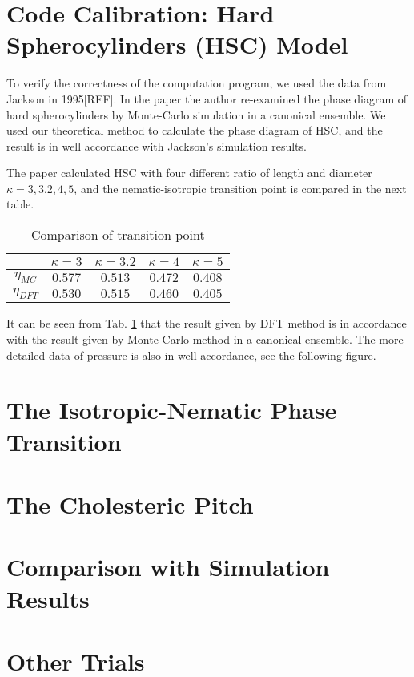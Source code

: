 \section{Code Calibration: Hard Spherocylinders (HSC) Model}
To verify the correctness of the computation program, we used the data from Jackson in 1995[REF]. In the paper the author re-examined the phase diagram of hard spherocylinders by Monte-Carlo simulation in a canonical ensemble. We used our theoretical method to calculate the phase diagram of HSC, and the result is in well accordance with Jackson's simulation results.

The paper calculated HSC with four different ratio of length and diameter $\kappa=3,3.2,4,5$, and the nematic-isotropic transition point is compared in the next table.

\begin{table}[h!]
	\caption{Comparison of transition point}
	\label{tab:comparison1995}
	\centering
	\begin{tabular}{c|cccc}
		\toprule
		 & $\kappa=3$ & $\kappa=3.2$ & $\kappa=4$ & $\kappa=5$\\
		\midrule
		$\eta_{MC}$ &  $0.577$ & $0.513$ & $0.472$ & $0.408$\\
		$\eta_{DFT}$ & $0.530$ & $0.515$ & $0.460$ & $0.405$\\
		\bottomrule
	\end{tabular}
\end{table}

It can be seen from Tab. \ref{tab:comparison1995} that the result given by DFT method is in accordance with the result given by Monte Carlo method in a canonical ensemble. The more detailed data of pressure is also in well accordance, see the following figure.

\section{The Isotropic-Nematic Phase Transition}



\section{The Cholesteric Pitch}

\section{Comparison with Simulation Results}

\section{Other Trials }

